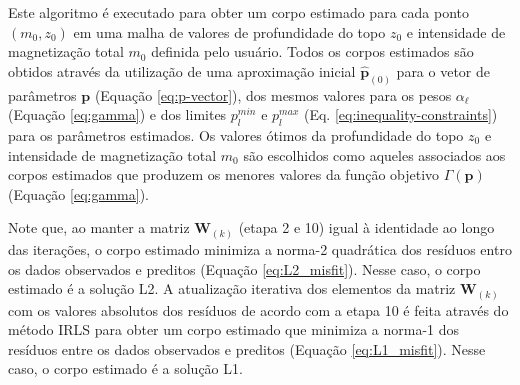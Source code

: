 Este algoritmo é executado para obter um corpo estimado para cada ponto 
$(m_{0}, z_{0})$ em uma malha de valores de profundidade do topo $z_{0}$ e intensidade de magnetização total $m_{0}$ definida pelo usuário. 
Todos os corpos estimados são obtidos através da utilização de uma aproximação inicial $\hat{\mathbf{p}}_{(0)}$ para o vetor de parâmetros
$\mathbf{p}$ (Equação \ref{eq:p-vector}), dos mesmos valores para os pesos
$\alpha_{\ell}$ (Equação \ref{eq:gamma}) e dos limites $p_{l}^{min}$ e 
$p_{l}^{max}$ (Eq. \ref{eq:inequality-constraints}) para os parâmetros estimados.
Os valores ótimos da profundidade do topo $z_{0}$ e intensidade de magnetização total
$m_{0}$ são escolhidos como aqueles associados aos corpos estimados que produzem os menores valores da função objetivo $\Gamma (\mathbf{p})$ (Equação \ref{eq:gamma}).

Note que, ao manter a matriz $\mathbf{W}_{(k)}$ (etapa 2 e 10) igual à identidade ao longo das iterações, o corpo estimado minimiza a norma-2 quadrática dos resíduos entro os dados observados e preditos (Equação \ref{eq:L2_misfit}). 
Nesse caso, o corpo estimado é a solução L2. 
A atualização iterativa dos elementos da matriz $\mathbf{W}_{(k)}$ com os valores absolutos dos resíduos de acordo com a etapa 10 é feita através do método IRLS \citep[][p. 46]{scales_gersztenkorn1988, aster_etal2019} para obter um corpo estimado que minimiza a norma-1 dos resíduos entre os dados observados e preditos 
(Equação \ref{eq:L1_misfit}). Nesse caso, o corpo estimado é a solução L1.


